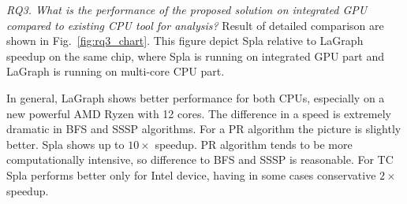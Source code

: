 \textit{RQ3. What is the performance of the proposed solution on integrated GPU compared to existing CPU tool for analysis?} Result of detailed comparison are shown in Fig.~\ref{fig:rq3_chart}. This figure depict Spla relative to LaGraph speedup on the same chip, where Spla is running on integrated GPU part and LaGraph is running on multi-core CPU part. 

In general, LaGraph shows better performance for both CPUs, especially on a new powerful AMD Ryzen with 12 cores. The difference in a speed is extremely dramatic in BFS and SSSP algorithms. For a PR algorithm the picture is slightly better. Spla shows up to $10\times$ speedup. PR algorithm tends to be more computationally intensive, so difference to BFS and SSSP is reasonable. For TC Spla performs better only for Intel device, having in some cases conservative $2\times$ speedup. 



